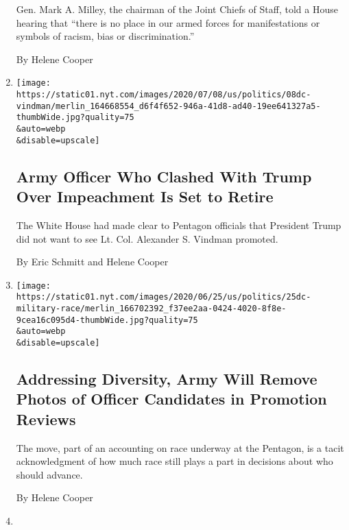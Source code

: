 \begin{enumerate}
  Gen. Mark A. Milley, the chairman of the Joint Chiefs of Staff, told a
  House hearing that ``there is no place in our armed forces for
  manifestations or symbols of racism, bias or discrimination.''

  By Helene Cooper
\item
  \href{/2020/07/08/us/politics/vindman-trump-ukraine-impeachment.html}{}

  \texttt{[image: https://static01.nyt.com/images/2020/07/08/us/politics/08dc-vindman/merlin\_164668554\_d6f4f652-946a-41d8-ad40-19ee641327a5-thumbWide.jpg?quality=75\\\&auto=webp\\\&disable=upscale]}

  \hypertarget{army-officer-who-clashed-with-trump-over-impeachment-is-set-to-retire}{%
  \subsection{Army Officer Who Clashed With Trump Over Impeachment Is
  Set to
  Retire}\label{army-officer-who-clashed-with-trump-over-impeachment-is-set-to-retire}}

  The White House had made clear to Pentagon officials that President
  Trump did not want to see Lt. Col. Alexander S. Vindman promoted.

  By Eric Schmitt and Helene Cooper
\item
  \href{/2020/06/25/us/politics/army-pentagon-race-promotions.html}{}

  \texttt{[image: https://static01.nyt.com/images/2020/06/25/us/politics/25dc-military-race/merlin\_166702392\_f37ee2aa-0424-4020-8f8e-9cea16c095d4-thumbWide.jpg?quality=75\\\&auto=webp\\\&disable=upscale]}

  \hypertarget{addressing-diversity-army-will-remove-photos-of-officer-candidates-in-promotion-reviews}{%
  \subsection{Addressing Diversity, Army Will Remove Photos of Officer
  Candidates in Promotion
  Reviews}\label{addressing-diversity-army-will-remove-photos-of-officer-candidates-in-promotion-reviews}}

  The move, part of an accounting on race underway at the Pentagon, is a
  tacit acknowledgment of how much race still plays a part in decisions
  about who should advance.

  By Helene Cooper
\item
  \href{/2020/06/25/us/politics/esper-trump-defense-military.html}{}


\end{enumerate}

